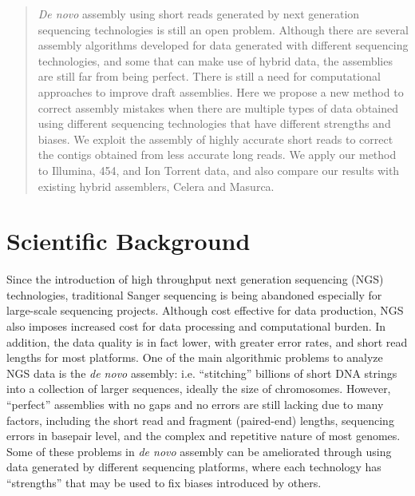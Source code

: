 \documentclass{llncs}
\begin{document}
\begin{abstract}
\textit{De novo} assembly using short reads generated by next generation sequencing technologies is still an open problem. Although there are several assembly algorithms developed for data generated with different sequencing technologies, and some that can make use of hybrid data, the assemblies are still far from being perfect. There is still a need for computational approaches to improve draft assemblies.
Here we propose a new method to correct assembly mistakes when there are multiple types of data obtained using different sequencing technologies that have different strengths and biases. We exploit the assembly of highly accurate short reads to correct the contigs obtained from less accurate  long reads.
We apply our method to Illumina, 454, and Ion Torrent data, and also compare our results with existing hybrid assemblers, Celera and Masurca.
\end{abstract}
%
\section{Scientific Background}
Since the introduction of high throughput next generation sequencing (NGS) technologies, traditional Sanger sequencing is being abandoned especially for large-scale sequencing projects.
Although cost effective for data production, NGS also imposes increased cost for data processing and computational burden. 
In addition, the data quality is in fact lower, with greater error rates, and short read lengths for most platforms. 
One of the main algorithmic problems to analyze NGS data is the \textit{de novo} assembly: i.e. ``stitching'' billions of short DNA strings into a collection of larger sequences, ideally the size of chromosomes. 
However, ``perfect'' assemblies with no gaps and no errors are still lacking due to many factors, including the short read and fragment (paired-end) lengths, sequencing errors in basepair level, and the complex and repetitive nature of most genomes. 
Some of these problems in \textit{de novo} assembly can be ameliorated through using data generated by different sequencing platforms, where each technology has ``strengths'' that may be used to fix biases introduced by others.
\end{document}
